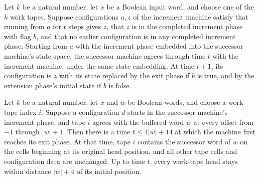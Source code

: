 \begin{theorem}
\label{Turing.rt_succ_increment}
\leanok
{}
Let $k$ be a natural number, let $x$ be a Boolean input word, and choose one of the $k$
work tapes. Suppose configurations $a,z$ of the increment machine satisfy that running
from $a$ for $t$ steps gives $z$, that $z$ is in the completed increment phase with flag
$b$, and that no earlier configuration is in any completed increment phase. Starting
from $a$ with the increment phase embedded into the successor machine's state space, the
successor machine agrees through time $t$ with the increment machine, under the same
state embedding. At time $t+1$, its configuration is $z$ with its state replaced by the
exit phase if $b$ is true, and by the extension phase's initial state if $b$ is false.
\end{theorem}

\begin{theorem}
\label{Turing.rt_succ_run}
\leanok
{}
Let $k$ be a natural number, let $x$ and $w$ be Boolean words, and choose a work-tape
index $i$. Suppose a configuration $d$ starts in the successor machine's increment
phase, and tape $i$ agrees with the buffered word $w$ at every offset from $-1$ through
$|w|+1$. Then there is a time $t\le 4|w|+14$ at which the machine first reaches its exit
phase. At that time, tape $i$ contains the successor word of $w$ on the cells beginning
at its original head position, and all other tape cells and configuration data are
unchanged. Up to time $t$, every work-tape head stays within distance $|w|+4$ of its
initial position.
\end{theorem}

